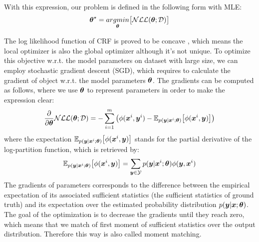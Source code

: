 With this expression, our problem is defined in the following form with MLE:
\begin{equation}
\label{crf_nll_opt}
\boldsymbol \theta^\star = \underset{{\boldsymbol \theta}}{argmin} \big[\mathcal{NLL(\boldsymbol \theta; \mathcal{D})}\big]
\end{equation}

The log likelihood function of CRF is proved to be concave \cite{koller2009probabilistic}, which means the local optimizer is also the global optimizer although it's not unique. To optimize this objective w.r.t. the model parameters on dataset with large size, we can employ stochastic gradient descent (SGD), which requires to calculate the gradient of object w.r.t. the model parameters $\boldsymbol \theta$. The gradients can be computed as follows, where we use $\boldsymbol \theta$ to represent parameters in order to make the expression clear:
\begin{equation}
\label{crf_grad}
\frac{\partial}{\partial \boldsymbol \theta} \mathcal{NLL}(\boldsymbol \theta; \mathcal{D}) = -\sum_{i=1}^{m}
\big(
\phi(\boldsymbol x^i, \boldsymbol y^i) - 
\mathbb{E}_{p(\boldsymbol y|\boldsymbol x^i;\boldsymbol \theta)}
\big[\phi(\boldsymbol x^i, \boldsymbol y)\big]
\big)
\end{equation}
where the expectation $\mathbb{E}_{p(\boldsymbol y|\boldsymbol x^i;\boldsymbol \theta)}
\big[\phi(\boldsymbol x^i, \boldsymbol y)\big]$ stands for the partial derivative of the log-partition function, which is retrieved by:
\begin{equation}
\label{exp_log_part}
\mathbb{E}_{p(\boldsymbol y|\boldsymbol x^i;\boldsymbol \theta)}
\big[\phi(\boldsymbol x^i, \boldsymbol y)\big] = \sum_{\boldsymbol y\in\mathcal{Y}}p(\boldsymbol y|\boldsymbol x^i;\boldsymbol \theta)\phi(\boldsymbol y, \boldsymbol x^i)
\end{equation}
The gradients of parameters corresponds to the difference between the empirical expectation of its associated sufficient statistics (the sufficient statistics of ground truth) and its expectation over the estimated probability distribution $p(\boldsymbol y|\boldsymbol x; \boldsymbol \theta)$. The goal of the optimization is to decrease the gradients until they reach zero, which means that we match of first moment of sufficient statistics over the output distribution. Therefore this way is also called moment matching.

